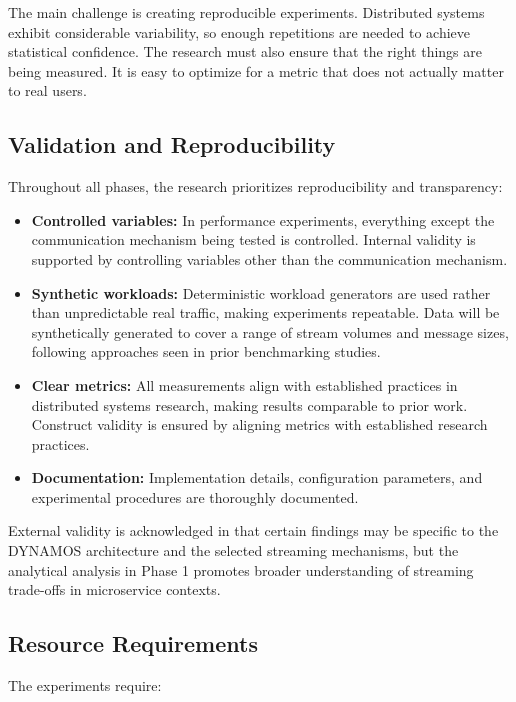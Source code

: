 \documentclass[a4paper,10pt,british]{scrartcl}
\begin{document}
\pargraph{}

The main challenge is creating reproducible experiments. Distributed systems exhibit considerable variability, so enough repetitions are needed to achieve statistical confidence. The research must also ensure that the right things are being measured. It is easy to optimize for a metric that does not actually matter to real users.

\subsection{Validation and Reproducibility}

Throughout all phases, the research prioritizes reproducibility and transparency:

\begin{itemize}
  \item \textbf{Controlled variables:} In performance experiments, everything except the communication mechanism being tested is controlled. Internal validity is supported by controlling variables other than the communication mechanism.
  \item \textbf{Synthetic workloads:} Deterministic workload generators are used rather than unpredictable real traffic, making experiments repeatable. Data will be synthetically generated to cover a range of stream volumes and message sizes, following approaches seen in prior benchmarking studies.
  \item \textbf{Clear metrics:} All measurements align with established practices in distributed systems research, making results comparable to prior work. Construct validity is ensured by aligning metrics with established research practices.
  \item \textbf{Documentation:} Implementation details, configuration parameters, and experimental procedures are thoroughly documented.
\end{itemize}

External validity is acknowledged in that certain findings may be specific to the DYNAMOS architecture and the selected streaming mechanisms, but the analytical analysis in Phase 1 promotes broader understanding of streaming trade-offs in microservice contexts.

\subsection{Resource Requirements}

The experiments require:
\end{document}
